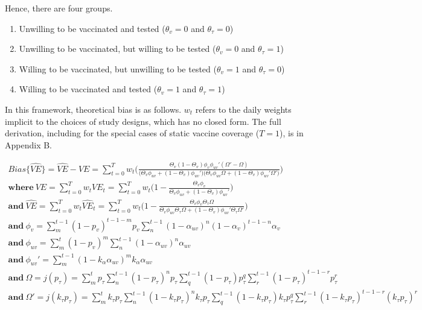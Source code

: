 \documentclass[12pt]{article}
\begin{document}
Hence, there are four groups.
\begin{enumerate}
	\item Unwilling to be vaccinated and tested ($\theta_{v} = 0$ and $\theta_{\tau} = 0$)
	\item Unwilling to be vaccinated, but willing to be tested ($\theta_{v} = 0$ and $\theta_{\tau} = 1$)
	\item Willing to be vaccinated, but unwilling to be tested ($\theta_{v} = 1$ and $\theta_{\tau} = 0$)
	\item Willing to be vaccinated and tested ($\theta_{v} = 1$ and $\theta_{\tau} = 1$)
\end{enumerate}

In this framework, theoretical bias is as follows. $w_t$ refers to the daily weights implicit to the choices of study designs, which has no closed form. The full derivation, including for the special cases of static vaccine coverage ($T=1$), is in Appendix B.

\begin{eqnarray}
	{Bias}\{\widehat{VE}\} = \widehat{VE} - VE = \sum_{t=0}^{T} w_{t} \bigg( \frac{\Theta_{v} ( 1 - \Theta_{v} ) \phi_v \phi_{uv}' ( \Omega' - \Omega ) }{\big( \Theta_{v} \phi_{uv} + (1 - \Theta_{v}) \phi_{uv}'  \big) \big( \Theta_{v} \phi_{uv} \Omega + ( 1 - \Theta_{v}) \phi_{uv}' \Omega' \big)} \bigg) \\ 
	\textbf{where} \ VE = \sum_{t=0}^{T} w_{t} VE_{t} = \sum_{t=0}^{T} w_{t} \Big( 1 - \frac{\Theta_{v}\phi_v}{\Theta_{v} \phi_{uv} + (1 - \Theta_{v}) \phi_{uv}' } \Big) \\
	\textbf{and} \ \widehat{VE} = \sum_{t=0}^{T} w_{t} \widehat{VE}_{t} = \sum_{t=0}^{T} w_{t} \Big( 1 - \frac{\Theta_{v}\phi_v\Theta_{\tau}\Omega }{\Theta_{v} \phi_{uv}\Theta_{\tau}\Omega + (1 - \Theta_{v}) \phi_{uv}'\Theta_{\tau}\Omega' } \Big) \\ 
	\textbf{and} \ \phi_v = \sum_{m}^{t-1} (1-p_v)^{t-1-m} p_v \sum_{n}^{t-1}(1-\alpha_{uv})^{n}(1-\alpha_{v})^{t-1-n}\alpha_{v} \\
	\textbf{and} \ \phi_{uv} = \sum_{m}^{t} (1-p_v)^{m} \sum_{n}^{t-1} (1-\alpha_{uv})^{n}\alpha_{uv} \\
	\textbf{and} \ \phi_{uv}' = \sum_{m}^{t-1} (1- k_\alpha \alpha_{uv})^{m} k_\alpha \alpha_{uv} \\
	\textbf{and} \ \Omega = j(p_\tau) = \sum_{m}^{t} p_{\tau} \sum_{n}^{t-1} (1-p_{\tau})^{n}p_{\tau} \sum_{q}^{t-1} (1-p_{\tau})p_{\tau}^{q} \sum_{r}^{t-1} (1-p_{\tau})^{t-1-r} p_{\tau}^{r} \\ 
	\textbf{and} \ \Omega' = j(k_\tau p_\tau) = \sum_{m}^{t} k_{\tau} p_{\tau} \sum_{n}^{t-1} (1- k_{\tau} p_{\tau})^{n} k_{\tau} p_{\tau} \sum_{q}^{t-1} (1- k_{\tau} p_{\tau}) k_{\tau} p_{\tau}^{q} \sum_{r}^{t-1} (1- k_{\tau} p_{\tau})^{t-1-r} (k_{\tau} p_{\tau})^{r}	
\end{eqnarray}
\end{document}

